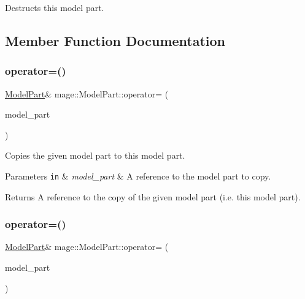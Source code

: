 Destructs this model part. 

\subsection{Member Function Documentation}
\hypertarget{structmage_1_1_model_part_a37e9d66b701ed84111160bf5a003b658}{}\label{structmage_1_1_model_part_a37e9d66b701ed84111160bf5a003b658} 
\subsubsection{\texorpdfstring{operator=()}{operator=()}\hspace{0.1cm}{\footnotesize\ttfamily [1/2]}}
{\footnotesize\ttfamily \hyperlink{structmage_1_1_model_part}{Model\+Part}\& mage\+::\+Model\+Part\+::operator= (\begin{DoxyParamCaption}\item[{const \hyperlink{structmage_1_1_model_part}{Model\+Part} \&}]{model\+\_\+part }\end{DoxyParamCaption})\hspace{0.3cm}{\ttfamily [default]}}

Copies the given model part to this model part.


\begin{DoxyParams}[1]{Parameters}
\mbox{\tt in}  & {\em model\+\_\+part} & A reference to the model part to copy. \\
\hline
\end{DoxyParams}
\begin{DoxyReturn}{Returns}
A reference to the copy of the given model part (i.\+e. this model part). 
\end{DoxyReturn}
\hypertarget{structmage_1_1_model_part_a8337b8034d9a43514690a2db3d0f43c7}{}\label{structmage_1_1_model_part_a8337b8034d9a43514690a2db3d0f43c7} 
\subsubsection{\texorpdfstring{operator=()}{operator=()}\hspace{0.1cm}{\footnotesize\ttfamily [2/2]}}
{\footnotesize\ttfamily \hyperlink{structmage_1_1_model_part}{Model\+Part}\& mage\+::\+Model\+Part\+::operator= (\begin{DoxyParamCaption}\item[{\hyperlink{structmage_1_1_model_part}{Model\+Part} \&\&}]{model\+\_\+part }\end{DoxyParamCaption})\hspace{0.3cm}{\ttfamily [default]}}


